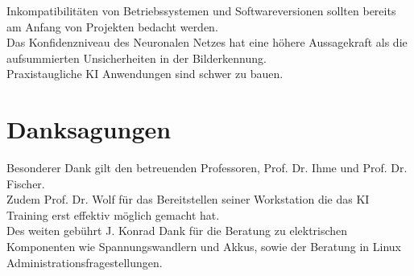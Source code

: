 \documentclass[conference]{IEEEtran}
\begin{document}
Inkompatibilitäten von Betriebssystemen und Softwareversionen sollten bereits am 
Anfang von Projekten bedacht werden. \\

Das Konfidenzniveau des Neuronalen Netzes hat eine höhere Aussagekraft
als die aufsummierten Unsicherheiten in der Bilderkennung.\\

Praxistaugliche KI Anwendungen sind schwer zu bauen.

	
\section*{Danksagungen}

Besonderer Dank gilt den betreuenden Professoren, Prof. Dr. Ihme und Prof. 
Dr. Fischer.\\
Zudem Prof. Dr. Wolf für das Bereitstellen seiner Workstation die das KI 
Training erst effektiv möglich gemacht hat.\\
Des weiten gebührt
 J. Konrad Dank für die Beratung zu elektrischen
Komponenten wie Spannungswandlern und Akkus, sowie der Beratung in 
Linux Administrationsfragestellungen.

	\printbibheading
	\printbibliography[filter=wissenschaftlich, heading=subbibliography, title={Fachliteratur}]
	\printbibliography[filter=nichtWissenschaftlich, heading=subbibliography, title={Web-Dokumente}]
	
\end{document}
